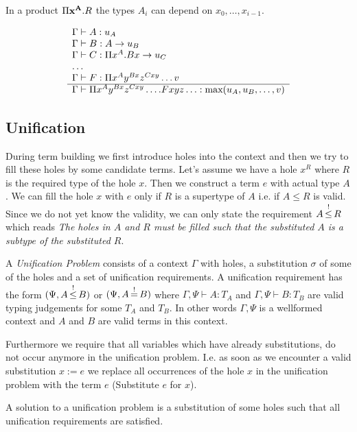 In a product $\Pi \mathbf{x}^{\mathbf{A}}. R$ the types $A_i$ can depend on $x_0, \ldots,
x_{i-1}$.

$$
\begin{array}{l} 
    \Gamma \vdash A: u_A
    \\
    \Gamma \vdash B: A \to u_B
    \\
    \Gamma \vdash C: \Pi x^A. B x \to u_C
    \\
    \ldots
    \\
    \Gamma \vdash F: \Pi x^A y^{B x} z^{C x y} \ldots v
 \\ \hline 
    \Gamma
    \vdash
    \Pi x^A y^{B x} z^{C x y} \ldots . F x y z \ldots
    :
    \text{max}(u_A, u_B, \ldots, v)
\end{array}
$$








\subsection{Unification}

During term building we first introduce holes into the context and then we try
to fill these holes by some candidate terms. Let's assume we have a hole $x^R$
where $R$ is the required type of the hole $x$. Then we construct a term $e$
with actual type $A$. We can fill the hole $x$ with $e$ only if $R$ is a
supertype of $A$ i.e. if $A \le R$ is valid. Since we do not yet know the
validity, we can only state the requirement $A {\,\stackrel{!}{\le}\,} R$ which reads \emph{The
holes in $A$ and $R$ must be filled such that the substituted $A$ is a subtype
of the substituted $R$}.



\begin{definition} A \emph{Unification Problem} consists of a context $\Gamma$
with holes, a substitution $\sigma$ of some of the holes and a set of
unification requirements. A unification requirement has the form $(\Psi, A
{\,\stackrel{!}{\le}\,} B)$ or $(\Psi, A {\,\stackrel{!}{=}\,} B)$ where $\Gamma,\Psi \vdash A: T_A$ and
$\Gamma,\Psi \vdash B: T_B$ are valid typing judgements for some $T_A$ and
$T_B$. In other words $\Gamma,\Psi$ is a wellformed context and $A$ and $B$ are
valid terms in this context.

Furthermore we require that all variables which have already substitutions, do
not occur anymore in the unification problem. I.e. as soon as we encounter a
valid substitution $x:=e$ we replace all occurrences of the hole $x$ in the
unification problem with the term $e$ (Substitute $e$ for $x$).

A solution to a unification problem is a substitution of some holes such that
all unification requirements are satisfied.
\end{definition}


